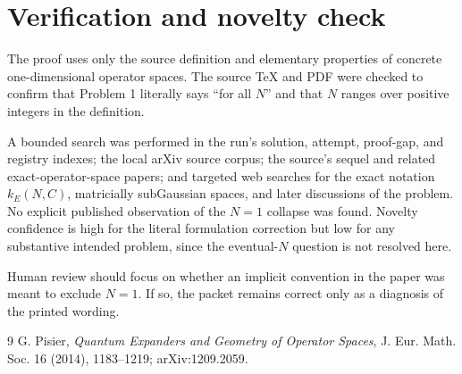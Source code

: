 \documentclass[11pt]{article}
\begin{document}
\section{Verification and novelty check}

The proof uses only the source definition and elementary properties of
concrete one-dimensional operator spaces. The source TeX and PDF were checked
to confirm that Problem 1 literally says ``for all $N$'' and that $N$ ranges
over positive integers in the definition.

A bounded search was performed in the run's solution, attempt, proof-gap, and
registry indexes; the local arXiv source corpus; the source's sequel and
related exact-operator-space papers; and targeted web searches for the exact
notation $k_E(N,C)$, matricially subGaussian spaces, and later discussions of
the problem. No explicit published observation of the $N=1$ collapse was
found. Novelty confidence is high for the literal formulation correction but
low for any substantive intended problem, since the eventual-$N$ question is
not resolved here.

Human review should focus on whether an implicit convention in the paper was
meant to exclude $N=1$. If so, the packet remains correct only as a diagnosis
of the printed wording.

\begin{thebibliography}{9}
G. Pisier,
\emph{Quantum Expanders and Geometry of Operator Spaces},
J. Eur. Math. Soc. 16 (2014), 1183--1219;
arXiv:1209.2059.
\end{thebibliography}
\end{document}
